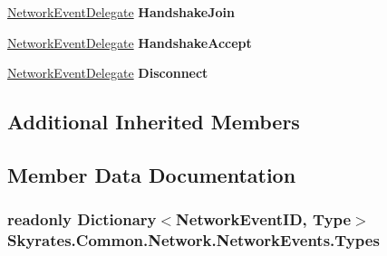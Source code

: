 \begin{DoxyCompactItemize}
\item 
\hypertarget{class_skyrates_1_1_common_1_1_network_1_1_network_events_a02cdce9c15c2eba6af9be6e465ca5afa}{\hyperlink{namespace_skyrates_1_1_common_1_1_network_a87882c06bd9c9c4138d4e098242f7b67}{Network\-Event\-Delegate} {\bfseries Handshake\-Join}}\label{class_skyrates_1_1_common_1_1_network_1_1_network_events_a02cdce9c15c2eba6af9be6e465ca5afa}

\item 
\hypertarget{class_skyrates_1_1_common_1_1_network_1_1_network_events_af1c180253ad421f8b2d7b3861628a7e5}{\hyperlink{namespace_skyrates_1_1_common_1_1_network_a87882c06bd9c9c4138d4e098242f7b67}{Network\-Event\-Delegate} {\bfseries Handshake\-Accept}}\label{class_skyrates_1_1_common_1_1_network_1_1_network_events_af1c180253ad421f8b2d7b3861628a7e5}

\item 
\hypertarget{class_skyrates_1_1_common_1_1_network_1_1_network_events_ade2cccbed4786f27d23acc3ed036bc61}{\hyperlink{namespace_skyrates_1_1_common_1_1_network_a87882c06bd9c9c4138d4e098242f7b67}{Network\-Event\-Delegate} {\bfseries Disconnect}}\label{class_skyrates_1_1_common_1_1_network_1_1_network_events_ade2cccbed4786f27d23acc3ed036bc61}

\end{DoxyCompactItemize}
\subsection*{Additional Inherited Members}


\subsection{Member Data Documentation}
\hypertarget{class_skyrates_1_1_common_1_1_network_1_1_network_events_a9360ac6e13813aa04c2f77c18fea5274}{
\subsubsection[{Types}]{\setlength{\rightskip}{0pt plus 5cm}readonly Dictionary$<${\bf Network\-Event\-I\-D}, Type$>$ Skyrates.\-Common.\-Network.\-Network\-Events.\-Types}}\label{class_skyrates_1_1_common_1_1_network_1_1_network_events_a9360ac6e13813aa04c2f77c18fea5274}


